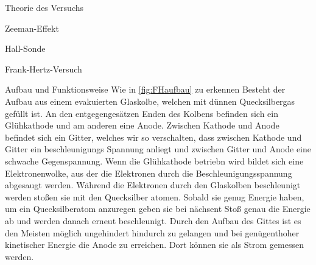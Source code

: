 \documentclass[pdftex, a4paper,11pt, twoside, ngerman]{report}
\begin{document}
\begin{chapter}{Theorie des Versuchs}
\begin{section}{Zeeman-Effekt}
\begin{subsection}{Hall-Sonde}

      \end{subsection}
      
    \end{section}
    
    
    
    \begin{section}{Frank-Hertz-Versuch}
      
      
      
      \begin{subsection}{Aufbau und Funktionsweise}
        Wie in \cref{fig:FHaufbau} zu erkennen Besteht der Aufbau aus einem
        evakuierten Glaskolbe, welchen mit dünnen Quecksilbergas gefüllt ist. 
        An den entgegengesätzen Enden des Kolbens befinden sich ein
        Glühkathode und am anderen eine Anode. Zwischen Kathode und Anode
        befindet sich ein Gitter, welches wir so verschalten, dass zwischen
        Kathode und Gitter ein beschleunigungs Spannung anliegt und zwischen
        Gitter und Anode eine schwache Gegenspannung. Wenn die Glühkathode
        betriebn wird bildet sich eine Elektronenwolke, aus der die Elektronen
        durch die Beschleunigungsspannung abgesaugt werden. Während die
        Elektronen durch den Glaskolben beschleunigt werden stoßen sie mit den
        Quecksilber atomen. Sobald sie genug Energie haben, um ein
        Quecksilberatom anzuregen geben sie bei nächsent Stoß genau die Energie
        ab und werden danach erneut beschleunigt. Durch den Aufbau des Gittes
        ist es den Meisten möglich ungehindert hindurch zu gelangen und bei
        genügenthoher kinetischer Energie die Anode zu erreichen. Dort können
        sie als Strom gemessen werden.
        \begin{figure}[ht]

\end{figure}
\end{subsection}
\end{section}
\end{chapter}
\end{document}
